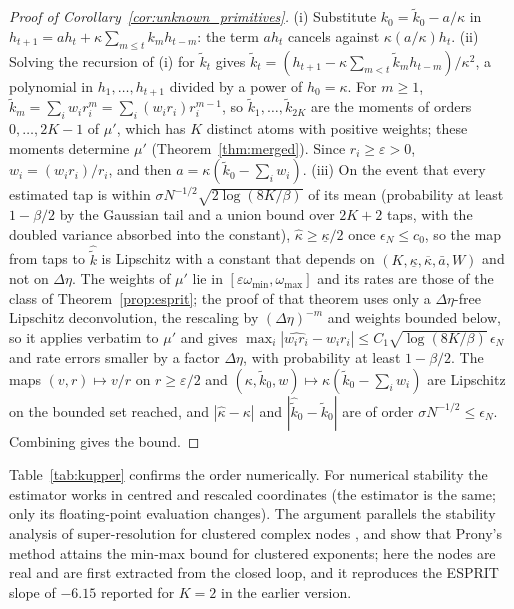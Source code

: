 \begin{proof}[Proof of Corollary~\ref{cor:unknown_primitives}]
(i) Substitute $k_0=\tilde k_0-a/\kappa$ in $h_{t+1}=ah_t+\kappa\sum_{m\le t}k_mh_{t-m}$: the term $ah_t$ cancels against $\kappa(a/\kappa)h_t$. (ii) Solving the recursion of (i) for $\tilde k_t$ gives $\tilde k_t=(h_{t+1}-\kappa\sum_{m<t}\tilde k_mh_{t-m})/\kappa^2$, a polynomial in $h_1,\ldots,h_{t+1}$ divided by a power of $h_0=\kappa$. For $m\ge1$, $\tilde k_m=\sum_iw_ir_i^m=\sum_i(w_ir_i)r_i^{m-1}$, so $\tilde k_1,\ldots,\tilde k_{2K}$ are the moments of orders $0,\ldots,2K-1$ of $\mu'$, which has $K$ distinct atoms with positive weights; these moments determine $\mu'$ (Theorem~\ref{thm:merged}). Since $r_i\ge\varepsilon>0$, $w_i=(w_ir_i)/r_i$, and then $a=\kappa(\tilde k_0-\sum_iw_i)$. (iii) On the event that every estimated tap is within $\sigma N^{-1/2}\sqrt{2\log(8K/\beta)}$ of its mean (probability at least $1-\beta/2$ by the Gaussian tail and a union bound over $2K+2$ taps, with the doubled variance absorbed into the constant), $\hat\kappa\ge\underline\kappa/2$ once $\epsilon_N\le c_0$, so the map from taps to $\hat{\tilde k}$ is Lipschitz with a constant that depends on $(K,\underline\kappa,\overline\kappa,\bar a,W)$ and not on $\Delta\eta$. The weights of $\mu'$ lie in $[\varepsilon\omega_{\min},\omega_{\max}]$ and its rates are those of the class of Theorem~\ref{prop:esprit}; the proof of that theorem uses only a $\Delta\eta$-free Lipschitz deconvolution, the rescaling by $(\Delta\eta)^{-m}$ and weights bounded below, so it applies verbatim to $\mu'$ and gives $\max_i|\widehat{w_ir_i}-w_ir_i|\le C_1\sqrt{\log(8K/\beta)}\,\epsilon_N$ and rate errors smaller by a factor $\Delta\eta$, with probability at least $1-\beta/2$. The maps $(v,r)\mapsto v/r$ on $r\ge\varepsilon/2$ and $(\kappa,\tilde k_0,w)\mapsto\kappa(\tilde k_0-\sum_iw_i)$ are Lipschitz on the bounded set reached, and $|\hat\kappa-\kappa|$ and $|\hat{\tilde k}_0-\tilde k_0|$ are of order $\sigma N^{-1/2}\le\epsilon_N$. Combining gives the bound.
\end{proof}


Table~\ref{tab:kupper} confirms the order numerically. For numerical stability the estimator works in centred and rescaled coordinates (the estimator is the same; only its floating-point evaluation changes). The argument parallels the stability analysis of super-resolution for clustered complex nodes \citep{batenkov2021}, and \citet{katz2023} show that Prony's method attains the min-max bound for clustered exponents; here the nodes are real and are first extracted from the closed loop, and it reproduces the ESPRIT slope of $-6.15$ reported for $K=2$ in the earlier version.

